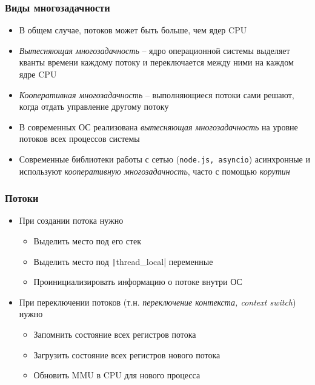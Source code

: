 \documentclass[10pt]{beamer}
\begin{document}
\begin{frame}[fragile]
\frametitle{Виды многозадачности}
\begin{itemize}
\item В общем случае, потоков может быть больше, чем ядер CPU
\pause
\item \textit{Вытесняющая многозадачность} -- ядро операционной системы выделяет кванты времени каждому потоку и переключается между ними на каждом ядре CPU
\pause
\item \textit{Кооперативная многозадачность} -- выполняющиеся потоки сами решают, когда отдать управление другому потоку
\pause
\item В современных ОС реализована \textit{вытесняющая многозадачность} на уровне потоков всех процессов системы
\pause
\item Современные библиотеки работы с сетью (\nolinkurl{node.js, asyncio}) асинхронные и используют \textit{кооперативную многозадачность}, часто с помощью \textit{корутин}
\end{itemize}
\end{frame}

\begin{frame}[fragile]
\frametitle{Потоки}
\begin{itemize}
\item При создании потока нужно
\pause
\begin{itemize}
\item Выделить место под его стек
\pause
\item Выделить место под \texttt|thread_local| переменные
\pause
\item Проинициализировать информацию о потоке внутри ОС
\end{itemize}
\pause
\item При переключении потоков (т.н. \textit{переключение контекста, context switch}) нужно
\pause
\begin{itemize}
\item Запомнить состояние всех регистров потока
\pause
\item Загрузить состояние всех регистров нового потока
\pause
\item Обновить MMU в CPU для нового процесса
\end{itemize}
\end{itemize}
\end{frame}
\end{document}
